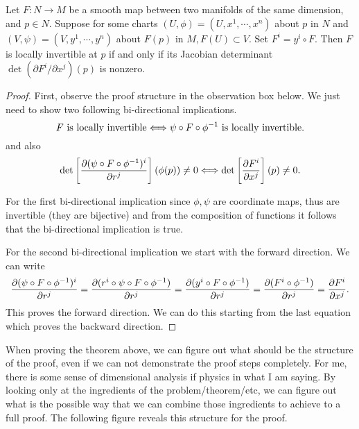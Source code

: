 \begin{theorem}
	\label{thm:InverseFunctionTheoremForManifolds}
	Let $ F: N \to M $ be a smooth map between two manifolds of the same dimension, and $ p \in N $. Suppose for some charts $ (U,\phi) = (U,x^1,\cdots,x^n) $ about $ p $ in $ N $ and $ (V,\psi) = (V,y^1,\cdots,y^n)$ about $ F(p) $ in $ M, F(U) \subset V $. Set $ F^i = y^i \circ F $. Then $ F $ is locally invertible at $ p $ if and only if its Jacobian determinant $ \det(\partial F^i/\partial x^j)(p) $ is nonzero.
\end{theorem}
\begin{proof}
	First, observe the proof structure in the observation box below. We just need to show two following bi-directional implications.
	\[ F \text{ is locally invertible} \Longleftrightarrow \psi\circ F \circ \phi^{-1} \text{ is locally invertible.} \]
	and also
	\[ \det \left[ \frac{\partial (\psi\circ F \circ \phi^{-1})^i}{\partial r^j}  \right](\phi(p)) \neq 0 \Longleftrightarrow \det\left[ \frac{\partial F^i}{\partial x^j} \right](p) \neq 0. \]
	
	For the first bi-directional implication since $ \phi,\psi $ are coordinate maps, thus are invertible (they are bijective) and from the composition of functions it follows that the bi-directional implication is true.
	
	For the second bi-directional implication we start with the forward direction. We can write
	\[ \frac{\partial (\psi\circ F \circ \phi^{-1})^i}{\partial r^j} = \frac{\partial (r^i \circ \psi \circ F \circ \phi^{-1})}{\partial r^j} = \frac{\partial(y^i\circ F\circ \phi^{-1})}{\partial r^j} = \frac{\partial( F^i \circ \phi^{-1})}{\partial r^j} =  \frac{\partial F^i}{\partial x^j}. \]
	This proves the forward direction. We can do this starting from the last equation which proves the backward direction.
\end{proof}

\begin{observation}
	When proving the theorem above, we can figure out what should be the structure of the proof, even if we can not demonstrate the proof steps completely. For me, there is some sense of dimensional analysis if physics in what I am saying. By looking only at the ingredients of the problem/theorem/etc, we can figure out what is the possible way that we can combine those ingredients to achieve to a full proof. The following figure reveals this structure for the proof.
\end{observation}
	
	
